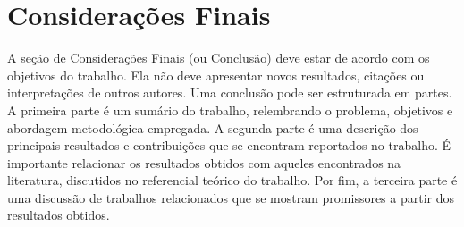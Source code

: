 \documentclass[a4paper,12pt]{article}
\begin{document}
	\section{Considerações Finais}
	\label{sec:con}
	
	A seção de Considerações Finais (ou Conclusão) deve estar de acordo com os objetivos do trabalho. Ela não deve apresentar novos resultados, citações ou interpretações de outros autores. Uma conclusão pode ser estruturada em partes. A primeira parte é um sumário do trabalho, relembrando o problema, objetivos e abordagem metodológica empregada. A segunda parte é uma descrição dos principais resultados e contribuições que se encontram reportados no trabalho. É importante relacionar os resultados obtidos com aqueles encontrados na literatura, discutidos no referencial teórico do trabalho. Por fim, a terceira parte é uma discussão de trabalhos relacionados que se mostram promissores a partir dos resultados obtidos.
	
	
	
	
	\newpage
	
	
	
	
\end{document}
